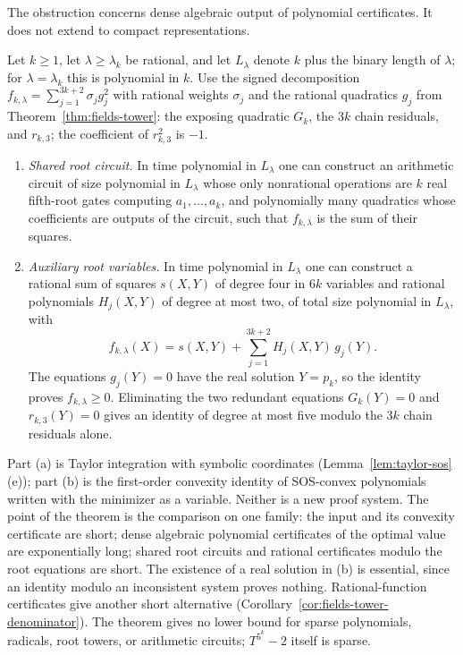 The obstruction concerns dense algebraic output of polynomial certificates.
It does not extend to compact representations.

\begin{theorem}
\label{thm:fields-compact}
Let $k\ge1$, let $\lambda\ge\lambda_k$ be rational, and let $L_\lambda$
denote $k$ plus the binary length of $\lambda$; for $\lambda=\lambda_k$ this is
polynomial in $k$. Use the signed decomposition
$f_{k,\lambda}=\sum_{j=1}^{3k+2}\sigma_jg_j^2$ with rational weights
$\sigma_j$ and the rational quadratics $g_j$ from
Theorem~\ref{thm:fields-tower}: the exposing quadratic $G_k$, the $3k$ chain
residuals, and $r_{k,3}$; the coefficient of $r_{k,3}^2$ is $-1$.
\begin{enumerate}[label=(\alph*)]
\item \emph{Shared root circuit.} In time polynomial in $L_\lambda$ one can
  construct an arithmetic circuit of size polynomial in $L_\lambda$ whose only
  nonrational
  operations are $k$ real fifth-root gates computing $a_1,\ldots,a_k$, and
  polynomially many quadratics whose coefficients are outputs of the circuit,
  such that $f_{k,\lambda}$ is the sum of their squares.
\item \emph{Auxiliary root variables.} In time polynomial in $L_\lambda$ one
  can construct a rational sum of squares $s(X,Y)$ of degree four in $6k$
  variables and rational polynomials $H_j(X,Y)$ of degree at most two, of
  total size polynomial in $L_\lambda$, with
  \[
   f_{k,\lambda}(X)=s(X,Y)+\sum_{j=1}^{3k+2}H_j(X,Y)\,g_j(Y).
  \]
  The equations $g_j(Y)=0$ have the real solution $Y=p_k$, so the identity
  proves $f_{k,\lambda}\ge0$. Eliminating the two redundant equations
  $G_k(Y)=0$ and $r_{k,3}(Y)=0$ gives an identity of degree at most five
  modulo the $3k$ chain residuals alone.
\end{enumerate}
\end{theorem}

Part (a) is Taylor integration with symbolic coordinates
(Lemma~\ref{lem:taylor-sos}(e)); part (b) is the first-order convexity
identity of SOS-convex polynomials \cite[Theorem~3.1]{AhmadiParrilo2013}
written with the minimizer as a variable. Neither is a new proof system.
The point of the theorem is the comparison on one family: the input and its
convexity certificate are short; dense algebraic polynomial certificates of
the optimal value are exponentially long; shared root circuits and rational
certificates modulo the root equations are short. The existence of a real
solution in (b) is essential, since an identity modulo an inconsistent
system proves nothing. Rational-function certificates give another short
alternative (Corollary~\ref{cor:fields-tower-denominator}). The theorem gives
no lower bound for sparse polynomials, radicals, root towers, or arithmetic
circuits; $T^{5^k}-2$ itself is sparse.

